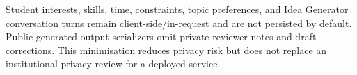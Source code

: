 Student interests, skills, time, constraints, topic preferences, and Idea Generator conversation turns remain client-side/in-request and are not persisted by default. Public generated-output serializers omit private reviewer notes and draft corrections. This minimisation reduces privacy risk but does not replace an institutional privacy review for a deployed service.
